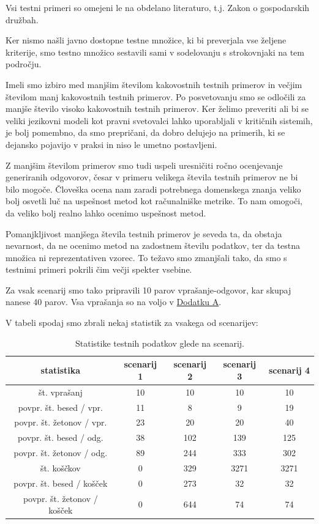 \documentclass[a4paper,12pt,openright]{book}
\begin{document}
Vsi testni primeri so omejeni le na obdelano literaturo, t.j. Zakon o gospodarskih družbah.

Ker nismo našli javno dostopne testne množice, ki bi preverjala vse željene kriterije, smo testno množico sestavili sami v sodelovanju s strokovnjaki na tem področju.

Imeli smo izbiro med manjšim številom kakovostnih testnih primerov in večjim številom manj kakovostnih testnih primerov. Po posvetovanju smo se odločili za manjše število visoko kakovostnih testnih primerov. Ker želimo preveriti ali bi se veliki jezikovni modeli kot pravni svetovalci lahko uporabljali v kritičnih sistemih, je bolj pomembno, da smo prepričani, da dobro delujejo na primerih, ki se dejansko pojavijo v praksi in niso le umetno postavljeni.

Z manjšim številom primerov smo tudi uspeli uresničiti ročno ocenjevanje generiranih odgovorov, česar v primeru velikega števila testnih primerov ne bi bilo mogoče. Človeška ocena nam zaradi potrebnega domenskega znanja veliko bolj osvetli luč na uspešnost metod kot računalniške metrike. To nam omogoči, da veliko bolj realno lahko ocenimo uspešnost metod.

Pomanjkljivost manjšega števila testnih primerov je seveda ta, da obstaja nevarnost, da ne ocenimo metod na zadostnem številu podatkov, ter da testna množica ni reprezentativen vzorec. To težavo smo zmanjšali tako, da smo s testnimi primeri pokrili čim večji spekter vsebine.

Za vsak scenarij smo tako pripravili 10 parov vprašanje-odgovor, kar skupaj nanese 40 parov. Vsa vprašanja so na voljo v \hyperref[appendix_a]{Dodatku A}.

V tabeli spodaj smo zbrali nekaj statistik za vsakega od scenarijev:

\begin{table}[H]
\centering
\caption{Statistike testnih podatkov glede na scenarij.}
\begin{tabular}{|c|c|c|c|c|}
\hline
statistika  & scenarij 1 & scenarij 2 & scenarij 3 & scenarij 4 \\ \hline
št. vprašanj                & 10   & 10    & 10     & 10     \\ \hline
povpr. št. besed / vpr.     & 11   & 8     & 9      & 19     \\ \hline
povpr. št. žetonov / vpr.   & 23   & 20    & 20     & 40     \\ \hline
povpr. št. besed / odg.     & 38   & 102   & 139    & 125    \\ \hline
povpr. št. žetonov / odg.   & 89   & 244   & 333    & 302    \\ \hline
št. koščkov                 & 0    & 329   & 3271   & 3271   \\ \hline
povpr. št. besed / košček   & 0    & 273   & 32     & 32     \\ \hline
povpr. št. žetonov / košček & 0    & 644   & 74     & 74     \\ \hline
\end{tabular}
\end{table}
\end{document}
